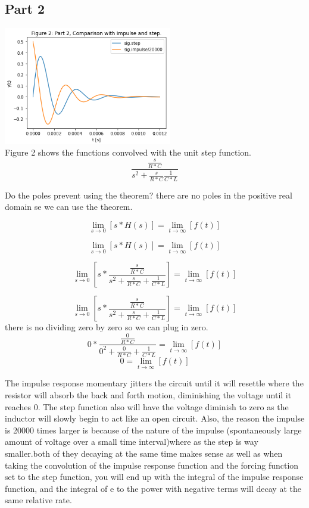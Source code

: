 \documentclass[12pt,a4paper]{article}
\begin{document}
\subsection*{Part 2}
\includegraphics[width=0.55\textwidth]{Figure2.png}\\
Figure 2 shows the functions convolved with the unit step function.\\

\[
\frac {\frac {s} {R*C}} {s^2+\frac{s}{R*C} \frac{1}{C*L}}
\]

Do the poles prevent using the theorem? there are no poles in the positive real domain se we can use the theorem.

\[
\lim _{s \to 0} \left [ s*H(s) \right] = \lim _{t \to \infty} \left [ f(t) \right]
\]

\[
\lim _{s \to 0} \left [ s*H(s) \right] = \lim _{t \to \infty} \left [ f(t) \right]
\]

\[
\lim _{s \to 0} \left [ s*\frac {\frac {s} {R*C}} {s^2+\frac{s}{R*C}+ \frac{1}{C*L}} \right] = \lim _{t \to \infty} \left [ f(t) \right]
\]

\[
\lim _{s \to 0} \left [ s*\frac {\frac {s} {R*C}} {s^2+\frac{s}{R*C} +\frac{1}{C*L}} \right] = \lim _{t \to \infty} \left [ f(t) \right]
\]
there is no dividing  zero by zero so we can plug in zero.
\[
 0*\frac {\frac {0} {R*C}} {0^2+\frac{0}{R*C}+ \frac{1}{C*L}} = \lim _{t \to \infty} \left [ f(t) \right]
\]
\[
 0 = \lim _{t \to \infty} \left [ f(t) \right]
\]


The impulse response momentary jitters the circuit until it will resettle where the resistor will absorb the back and forth motion, diminishing the voltage until it reaches 0. The step function also will have the voltage diminish to zero as the inductor will slowly begin to act like an open circuit.
Also, the reason the impulse is 20000 times larger is because of the nature of the impulse (spontaneously large amount of voltage over a small time interval)where as the step is way smaller.both of they decaying at the same time makes sense as well as when taking the convolution of the impulse response function and the forcing function set to the step function, you will end up with the integral of the impulse response function, and the integral of e to the power with negative terms will decay at the same relative rate.
\end{document}
